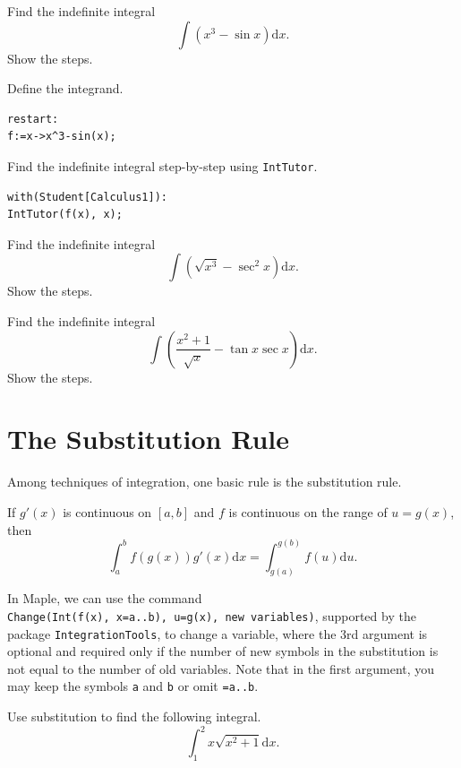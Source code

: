 \documentclass[]{book}
\theoremstyle{definition}
\theoremstyle{definition}
\theoremstyle{definition}
\theoremstyle{remark}
\let\BeginKnitrBlock\begin \let\EndKnitrBlock\end
\begin{document}
\BeginKnitrBlock{example}
\protect\hypertarget{exm:unnamed-chunk-144}{}{\label{exm:unnamed-chunk-144} }
Find the indefinite integral
\[
\int(x^3-\sin x)\mathrm{d} x.
\]
Show the steps.
\EndKnitrBlock{example}

\BeginKnitrBlock{solution}
{}
Define the integrand.

\begin{verbatim}
restart:
f:=x->x^3-sin(x);
\end{verbatim}

Find the indefinite integral step-by-step using \texttt{IntTutor}.

\begin{verbatim}
with(Student[Calculus1]):
IntTutor(f(x), x);
\end{verbatim}
\EndKnitrBlock{solution}

\BeginKnitrBlock{exercise}
\protect\hypertarget{exr:unnamed-chunk-146}{}{\label{exr:unnamed-chunk-146} }
Find the indefinite integral
\[
\int(\sqrt{x^3}-\sec^2x)\mathrm{d} x.
\]
Show the steps.
\EndKnitrBlock{exercise}

\BeginKnitrBlock{exercise}
\protect\hypertarget{exr:unnamed-chunk-147}{}{\label{exr:unnamed-chunk-147} }
Find the indefinite integral
\[
\int\left(\frac{x^2+1}{\sqrt{x}}-\tan x\sec x\right)\mathrm{d} x.
\]
Show the steps.
\EndKnitrBlock{exercise}

\hypertarget{the-substitution-rule}{%
\section{The Substitution Rule}\label{the-substitution-rule}}

Among techniques of integration, one basic rule is the substitution rule.

If \(g'(x)\) is continuous on \([a, b]\) and \(f\) is continuous on the range of \(u=g(x)\), then
\[
\int_a^bf(g(x))g'(x)\mathrm{d} x=\int_{g(a)}^{g(b)}f(u)\mathrm{d} u.
\]

In Maple, we can use the command \texttt{Change(Int(f(x),\ x=a..b),\ u=g(x),\ new\ variables)}, supported by the package \texttt{IntegrationTools}, to change a variable, where the 3rd argument is optional and required only if the number of new symbols in the substitution is not equal to the number of old variables. Note that in the first argument, you may keep the symbols \texttt{a} and \texttt{b} or omit \texttt{=a..b}.

\BeginKnitrBlock{example}
\protect\hypertarget{exm:unnamed-chunk-148}{}{\label{exm:unnamed-chunk-148} }
Use substitution to find the following integral.
\[
\int_1^2x\sqrt{x^2+1}\mathrm{d} x.
\]
\EndKnitrBlock{example}
\end{document}
